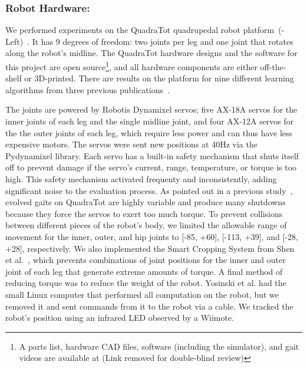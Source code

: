\subsubsection{Robot Hardware:}

We performed experiments on the QuadraTot quadrupedal robot platform~(-Left)~\cite{yos:clune}.
It has 9 degrees of freedom: two joints per leg and one joint that rotates along the robot's midline. %
The QuadraTot hardware designs and the software for this project are open source\footnote{A parts list, hardware CAD files, software (including the simulator), and gait videos are available at (Link removed for double-blind review)}, and all hardware components are either off-the-shelf or 3D-printed. %
There are results on the platform for nine different learning algorithms from three previous publications~\cite{yos:clune,glette,haocheng}. 


The joints are powered by Robotis Dynamixel servos; five AX-18A servos for the inner joints of each leg and the single midline joint, and four AX-12A servos for the the outer joints of each leg, which require less power and can thus have less expensive motors. The servos were sent new positions at 40Hz via the Pydynamixel library. Each servo has a built-in safety mechanism that shuts itself off to prevent damage if the servo's current, range, temperature, or torque is too high. This safety mechanism activated frequenty and inconsistently, adding significant noise to the evaluation process. As pointed out in a previous study~\cite{yos:clune}, evolved gaits on QuadraTot are highly variable and produce many shutdowns because they force the servos to exert too much torque.
To prevent collisions between different pieces of the robot's body, we limited the allowable range of movement for the inner, outer, and hip joints to [-85\degree, +60\degree], [-113\degree, +39\degree], and [-28\degree, +28\degree], respectively. We also implemented the Smart Cropping System from Shen et al.~\cite{haocheng}, which prevents combinations of joint positions for the inner and outer joint of each leg that generate extreme amounts of torque. A final method of reducing torque was to reduce the weight of the robot. Yosinski et al. had the small Linux computer that performed all computation on the robot, but we removed it and sent commands from it to the robot via a cable. We tracked the robot's position using an infrared LED observed by a Wiimote.
